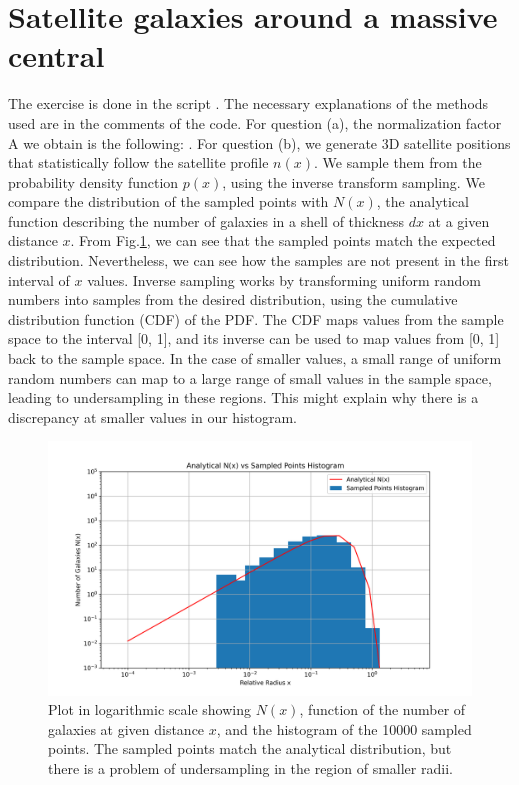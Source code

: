 \section{Satellite galaxies around a massive central}
The exercise is done in the script . The necessary explanations of the methods used are in the comments of the code.
For question (a), the normalization factor A we obtain is the following: .
For question (b), we generate 3D satellite positions that statistically follow the satellite profile $n(x)$. We sample them from the probability density function $p(x)$, using the inverse transform sampling. We compare the distribution of the sampled points with $N(x)$, the analytical function describing the number of galaxies in a shell of thickness $dx$ at a given distance $x$. From Fig.\ref{fig:n_vs_hist}, we can see that the sampled points match the expected distribution. Nevertheless, we can see how the samples are not present in the first interval of $x$ values. Inverse sampling works by transforming uniform random numbers into samples from the desired distribution, using the cumulative distribution function (CDF) of the PDF. The CDF maps values from the sample space to the interval [0, 1], and its inverse can be used to map values from [0, 1] back to the sample space. In the case of smaller values, a small range of uniform random numbers can map to a large range of small values in the sample space, leading to undersampling in these regions.
This might explain why there is a discrepancy at smaller values in our histogram.

\begin{figure}[h!]
  \centering
  \includegraphics[width=0.9\linewidth]{./plots/my_solution_1b.png}
  \caption{Plot in logarithmic scale showing $N(x)$, function of the number of galaxies at given distance $x$, and the histogram of the 10000 sampled points. The sampled points match the analytical distribution, but there is a problem of undersampling in the region of smaller radii.}
  \label{fig:n_vs_hist}
\end{figure}

